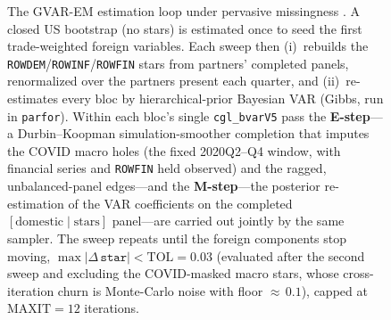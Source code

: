 \documentclass[11pt]{article}
\theoremstyle{plain}
\theoremstyle{remark}
\begin{document}
\begin{figure}[!ht]
\caption{The GVAR-EM estimation loop under pervasive missingness
\citep{GiannoneLenzaPrimiceri2019, DurbinKoopman2002}. A closed US
bootstrap (no stars) is estimated once to seed the first trade-weighted
foreign variables. Each sweep then (i)~rebuilds the
\texttt{ROWDEM}/\texttt{ROWINF}/\texttt{ROWFIN} stars from partners'
completed panels, renormalized over the partners present each quarter,
and (ii)~re-estimates every bloc by hierarchical-prior Bayesian VAR
(Gibbs, run in \texttt{parfor}). Within each bloc's single
\texttt{cgl\_bvarV5} pass the \textbf{E-step}---a Durbin--Koopman
simulation-smoother completion that imputes the COVID macro holes (the
fixed 2020Q2--Q4 window, with financial series and \texttt{ROWFIN} held
observed) and the ragged, unbalanced-panel edges---and the
\textbf{M-step}---the posterior re-estimation of the VAR coefficients on
the completed $[\text{domestic}\mid\text{stars}]$ panel---are carried out
jointly by the same sampler. The sweep repeats until the foreign
components stop moving, $\max|\Delta\,\texttt{star}| < \mathrm{TOL}=0.03$
(evaluated after the second sweep and excluding the COVID-masked macro
stars, whose cross-iteration churn is Monte-Carlo noise with floor
${\approx}\,0.1$), capped at $\mathrm{MAXIT}=12$ iterations.}
\label{fig:em-loop}
\end{figure}
\end{document}
